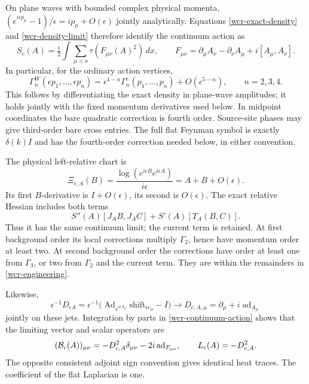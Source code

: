 \documentclass[11pt]{article}
\theoremstyle{remark}
\begin{document}
On plane waves with bounded complex physical momenta,
\((e^{i\epsilon p_\mu}-1)/\epsilon=ip_\mu+O(\epsilon)\)
jointly analytically. Equations \eqref{wcr-exact-density} and
\eqref{wcr-density-limit} therefore identify the continuum action as
\begin{equation}
 S_c(A)=\tfrac12\int\sum_{\mu<\nu}\tau(F_{\mu\nu}(A)^2)\,dx,\qquad
 F_{\mu\nu}=\partial_\mu A_\nu-\partial_\nu A_\mu+i[A_\mu,A_\nu].
 \label{wcr-continuum-action}
\end{equation}
In particular, for the ordinary action vertices,
\begin{equation}
 \Gamma_n^W(\epsilon p_1,\ldots,\epsilon p_n)
 =\epsilon^{4-n}\Gamma_n^c(p_1,\ldots,p_n)
                  +O(\epsilon^{5-n}),\qquad n=2,3,4.
 \label{wcr-engineering}
\end{equation}
This follows by differentiating the exact density in plane-wave
amplitudes; it holds jointly with the fixed momentum derivatives used
below. In midpoint coordinates the bare quadratic correction is fourth
order. Source-site phases may give third-order bare cross entries.
The full flat Feynman symbol is exactly \(\delta(k)I\) and has the
fourth-order correction needed below, in either convention.

The physical left-relative chart is
\[
 \Xi_{\epsilon,A}(B)
   =\frac{\log(e^{i\epsilon B}e^{i\epsilon A})}{i\epsilon}
   =A+B+O(\epsilon).
\]
Its first \(B\)-derivative is \(I+O(\epsilon)\), its second is
\(O(\epsilon)\). The exact relative Hessian includes both terms
\[
 S''(A)[J_AB,J_AC]+S'(A)[T_A(B,C)].
\]
Thus it has the same continuum limit; the current term is retained.
At first background order its local corrections multiply
\(\Gamma_2\), hence have momentum order at least two.
At second background order the corrections have order at least one
from \(\Gamma_3\), or two from \(\Gamma_2\) and the current term.
They are within the remainders in \eqref{wcr-engineering}.

Likewise,
\[
 \epsilon^{-1}D_{\epsilon A}
 =\epsilon^{-1}
   \bigl(\operatorname{Ad}_{e^{i\epsilon A_\mu}}
                          \mathrm{shift}_{\epsilon e_\mu}-I\bigr)
 \longrightarrow D_{c,A,\mu}=\partial_\mu+i\operatorname{ad}_{A_\mu}
\]
jointly on these jets. Integration by parts in
\eqref{wcr-continuum-action} shows that the limiting vector and scalar
operators are
\begin{equation}
 ({\cal B}_c(A))_{\mu\nu}
 =-D_{c,A}^2\delta_{\mu\nu}-2i\operatorname{ad}_{F_{\mu\nu}},
 \qquad L_c(A)=-D_{c,A}^2.
 \label{wcr-continuum-operators}
\end{equation}
The opposite consistent adjoint sign convention gives identical heat
traces. The coefficient of the flat Laplacian is one.
\end{document}

